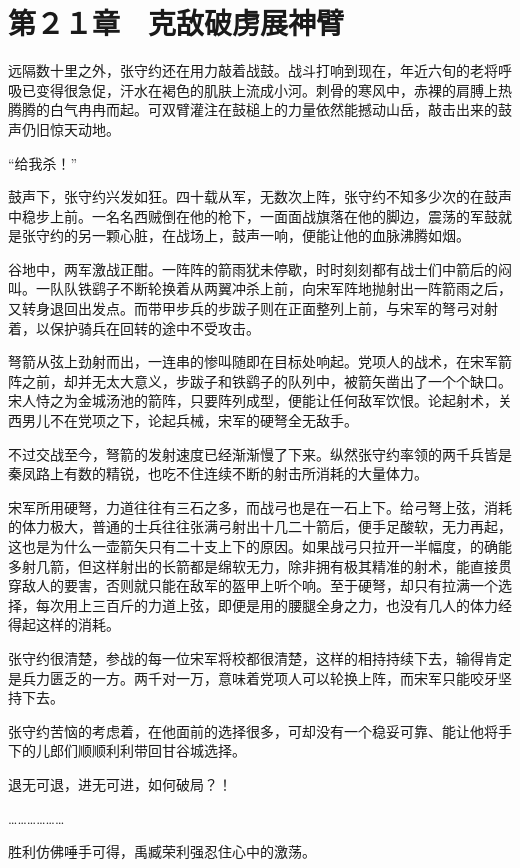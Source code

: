 \section{第２１章　克敌破虏展神臂}

远隔数十里之外，张守约还在用力敲着战鼓。战斗打响到现在，年近六旬的老将呼吸已变得很急促，汗水在褐色的肌肤上流成小河。刺骨的寒风中，赤裸的肩膊上热腾腾的白气冉冉而起。可双臂灌注在鼓槌上的力量依然能撼动山岳，敲击出来的鼓声仍旧惊天动地。

“给我杀！”

鼓声下，张守约兴发如狂。四十载从军，无数次上阵，张守约不知多少次的在鼓声中稳步上前。一名名西贼倒在他的枪下，一面面战旗落在他的脚边，震荡的军鼓就是张守约的另一颗心脏，在战场上，鼓声一响，便能让他的血脉沸腾如烟。

谷地中，两军激战正酣。一阵阵的箭雨犹未停歇，时时刻刻都有战士们中箭后的闷叫。一队队铁鹞子不断轮换着从两翼冲杀上前，向宋军阵地抛射出一阵箭雨之后，又转身退回出发点。而带甲步兵的步跋子则在正面整列上前，与宋军的弩弓对射着，以保护骑兵在回转的途中不受攻击。

弩箭从弦上劲射而出，一连串的惨叫随即在目标处响起。党项人的战术，在宋军箭阵之前，却并无太大意义，步跋子和铁鹞子的队列中，被箭矢凿出了一个个缺口。宋人恃之为金城汤池的箭阵，只要阵列成型，便能让任何敌军饮恨。论起射术，关西男儿不在党项之下，论起兵械，宋军的硬弩全无敌手。

不过交战至今，弩箭的发射速度已经渐渐慢了下来。纵然张守约率领的两千兵皆是秦凤路上有数的精锐，也吃不住连续不断的射击所消耗的大量体力。

宋军所用硬弩，力道往往有三石之多，而战弓也是在一石上下。给弓弩上弦，消耗的体力极大，普通的士兵往往张满弓射出十几二十箭后，便手足酸软，无力再起，这也是为什么一壶箭矢只有二十支上下的原因。如果战弓只拉开一半幅度，的确能多射几箭，但这样射出的长箭都是绵软无力，除非拥有极其精准的射术，能直接贯穿敌人的要害，否则就只能在敌军的盔甲上听个响。至于硬弩，却只有拉满一个选择，每次用上三百斤的力道上弦，即便是用的腰腿全身之力，也没有几人的体力经得起这样的消耗。

张守约很清楚，参战的每一位宋军将校都很清楚，这样的相持持续下去，输得肯定是兵力匮乏的一方。两千对一万，意味着党项人可以轮换上阵，而宋军只能咬牙坚持下去。

张守约苦恼的考虑着，在他面前的选择很多，可却没有一个稳妥可靠、能让他将手下的儿郎们顺顺利利带回甘谷城选择。

退无可退，进无可进，如何破局？！

………………

胜利仿佛唾手可得，禹臧荣利强忍住心中的激荡。

